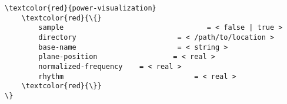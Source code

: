 \documentclass[9pt,a4paper]{article}
\begin{document}
\begin{landscape}
\begin{multicols}{3}
\begin{Verbatim}[fontsize=\footnotesize, tabsize=2, fontfamily=courier,	fontseries=b, commandchars=\\\{\}]
	\textcolor{red}{power-visualization}
	\textcolor{red}{\{}
		sample  								= < false | true >
		directory  						 = < /path/to/location >
		base-name  						 = < string >
		plane-position  				= < real >
		normalized-frequency  	= < real >
		rhythm		 						 = < real >
	\textcolor{red}{\}}
\}
\end{Verbatim}
\end{multicols}
\end{landscape}
\end{document}
